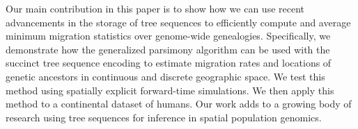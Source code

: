 Our main contribution in this paper is to show how we can use recent
advancements in the storage of tree sequences to efficiently compute and
average minimum migration statistics over genome-wide genealogies. Specifically,
we demonstrate how the generalized parsimony algorithm
\citep{Sankoff_1975, Sankoff_Rousseau_1975} can be used with the succinct tree 
sequence encoding \citep{Kelleher_etal_2016} to estimate migration rates and 
locations of genetic ancestors in continuous and discrete geographic space.
We test this method using spatially explicit forward-time simulations. We then 
apply this method to a continental dataset of humans. Our work adds to a
growing body of research using tree sequences for inference in spatial 
population genomics.





